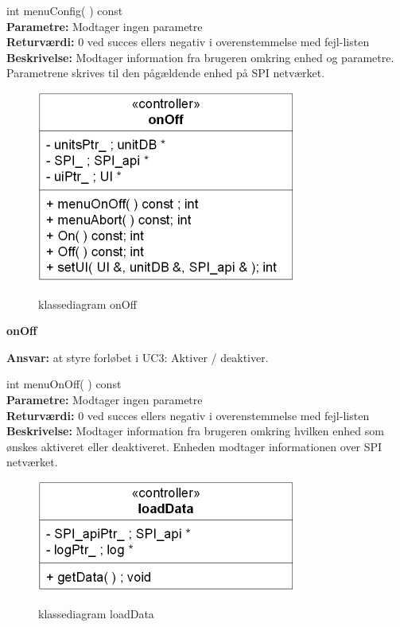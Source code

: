int menuConfig( ) const \\
\textbf{Parametre:} Modtager ingen parametre \\
\textbf{Returværdi:} 0 ved succes ellers negativ i overenstemmelse med fejl-listen \\
\textbf{Beskrivelse:} Modtager information fra brugeren omkring enhed og parametre. Parametrene skrives til den pågældende enhed på SPI netværket.\\

\begin{figure}[htbp] \centering
{\includegraphics[scale=1.5]{filer/design/Klassediagrammer/sw_onOff}}
\caption{klassediagram onOff}
\label{fig:onOff klassediagram}
\end{figure} 

\newpage

{\centering
\textbf{onOff}\par
}
\textbf{Ansvar:} at styre forløbet i UC3: Aktiver / deaktiver. \

int menuOnOff( ) const \\
\textbf{Parametre:} Modtager ingen parametre \\
\textbf{Returværdi:} 0 ved succes ellers negativ i overenstemmelse med fejl-listen \\
\textbf{Beskrivelse:} Modtager information fra brugeren omkring hvilken enhed som ønskes aktiveret eller deaktiveret. Enheden modtager informationen over SPI netværket.\\

\begin{figure}[htbp] \centering
{\includegraphics[scale=1.5]{filer/design/Klassediagrammer/sw_loadData}}
\caption{klassediagram loadData}
\label{fig:loadData klassediagram}
\end{figure} 

